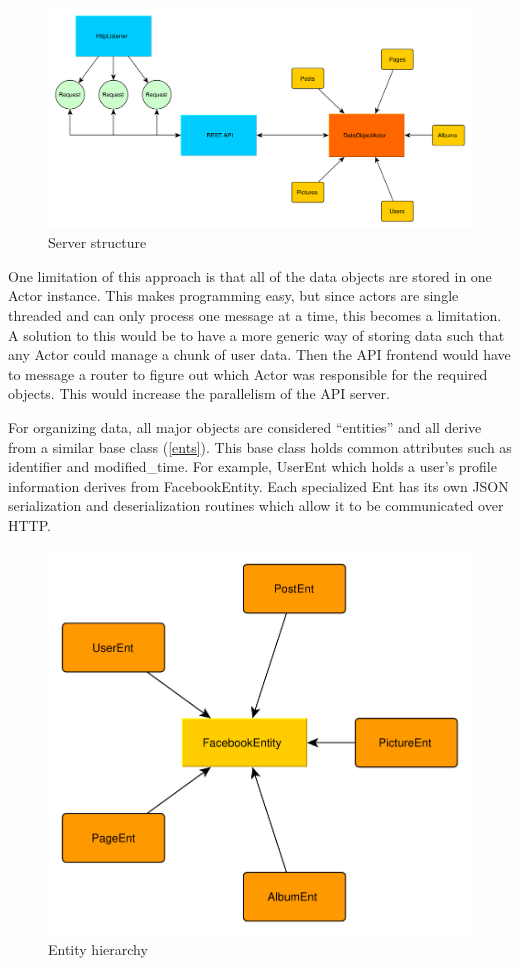 \documentclass{article}
\begin{document}
\begin{figure}[H]
  \centering
  \includegraphics[scale=0.5]{diagrams/server-structure.pdf}
  \caption{Server structure}
  \label{svr-struct}
\end{figure}

One limitation of this approach is that all of the data objects are stored in one Actor instance. This makes programming easy, but since actors are single threaded and can only process one message at a time, this becomes a limitation. A solution to this would be to have a more generic way of storing data such that any Actor could manage a chunk of user data. Then the API frontend would have to message a router to figure out which Actor was responsible for the required objects. This would increase the parallelism of the API server.

For organizing data, all major objects are considered ``entities'' and all derive from a similar base class (\autoref{ents}). This base class holds common attributes such as identifier and modified\_time. For example, UserEnt which holds a user's profile information derives from FacebookEntity. Each specialized Ent has its own JSON serialization and deserialization routines which allow it to be communicated over HTTP.

\begin{figure}[H]
  \centering
  \includegraphics[scale=0.5]{diagrams/entity-hierarchy.pdf}
  \caption{Entity hierarchy}
  \label{ents}
\end{figure}
\end{document}
